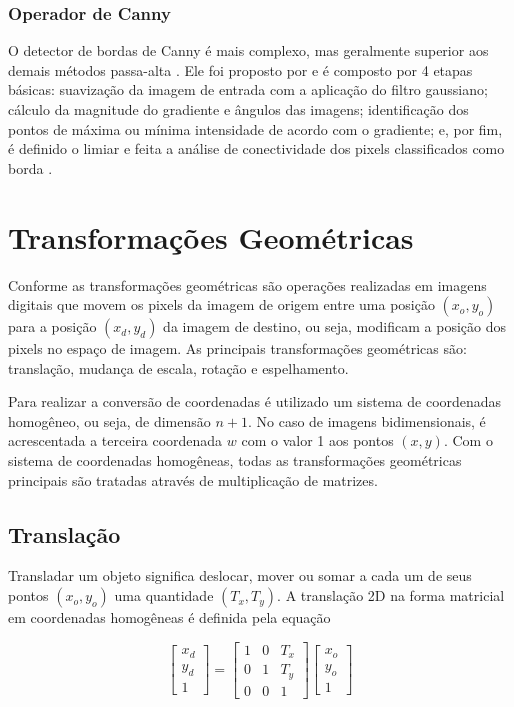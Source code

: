 \documentclass[12pt,oneside,a4paper,english,french,spanish,brazil,]{abntex2}
\begin{document}

\subsubsection{Operador de Canny}

O detector de bordas de Canny é mais complexo, mas geralmente superior aos demais métodos passa-alta \cite{gonzalez:2012}. Ele foi proposto por \citet{canny:1987} e é composto por 4 etapas básicas: suavização da imagem de entrada com a aplicação do filtro gaussiano; cálculo da magnitude do gradiente e ângulos das imagens; identificação dos pontos de máxima ou mínima intensidade de acordo com o gradiente; e, por fim, é definido o limiar e feita a análise de conectividade dos pixels classificados como borda \cite{gonzalez:2012}.



\section{Transformações Geométricas}

Conforme \citet{conci:2003} as transformações geométricas são operações realizadas em imagens digitais que movem os pixels da imagem de origem entre uma posição \((x_o,y_o)\) para a posição \((x_d,y_d)\) da imagem de destino, ou seja, modificam a posição dos pixels no espaço de imagem. As principais transformações geométricas são: translação, mudança de escala, rotação e espelhamento.

Para realizar a conversão de coordenadas é utilizado um sistema de coordenadas homogêneo, ou seja, de dimensão \(n+1\). No caso de imagens bidimensionais, é acrescentada a terceira coordenada \(w\) com o valor 1 aos pontos \((x, y)\). Com o sistema de coordenadas homogêneas, todas as transformações geométricas principais são tratadas através de multiplicação de matrizes.

\subsection{Translação}

Transladar um objeto significa deslocar, mover ou somar a cada um de seus pontos \((x_o,y_o)\) uma quantidade \((T_x,T_y)\). A translação 2D na forma matricial em coordenadas homogêneas é definida pela equação

\[
\begin{bmatrix}
x_d\\ 
y_d\\ 
1
\end{bmatrix}
=
\begin{bmatrix}
1 & 0 & T_x\\ 
0 & 1 & T_y\\ 
0 & 0 & 1
\end{bmatrix}
\begin{bmatrix}
x_o\\ 
y_o\\ 
1
\end{bmatrix}
\]
\end{document}
